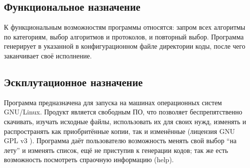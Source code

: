 \subsection{Функциональное назначение}
К функциональным возможностям программы относятся: запром всех алгоритмы по
категориям, выбор алгоритмов и протоколов, и повторный выбор. Программа
генерирует в указанной в конфигурационном файле директории коды, после чего
заканчивает своё исполнение.

\subsection{Эскплутационное назначение}
Программа предназначена для запуска на машинах операционных систем GNU/Linux.
Продукт является свободным ПО, что позволяет беспрепятственно скачивать,
изучать исходные файлы, использовать их для своих нужд, изменять и
распространять как приобритённые копии, так и изменённые (лицензия GNU GPL v3
\cite{gnu}).
Программа даёт пользователю возможность менять свой выбор ``на лету'' и
изменять список, ещё не приступив к генерации кодов; так же есть возможность
посмотреть спраочную информацию (help).


